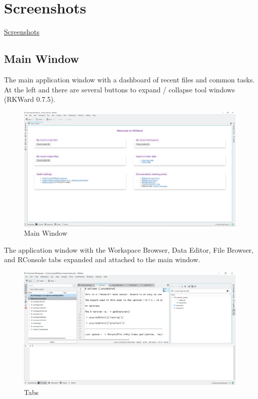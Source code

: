 \documentclass[
  letterpaper,
  DIV=11,
  numbers=noendperiod]{scrreprt}
\begin{document}

\hypertarget{screenshots}{%
\chapter{Screenshots}\label{screenshots}}

\href{https://rkward.kde.org/Screenshots.html}{Screenshots}

\hypertarget{main-window}{%
\section{Main Window}\label{main-window}}

The main application window with a dashboard of recent files and common
tasks. At the left and there are several buttons to expand / collapse
tool windows (RKWard 0.7.5).

\begin{figure}

{\centering \includegraphics{./images/main_window.png}

}

\caption{Main Window}

\end{figure}

The application window with the Workspace Browser, Data Editor, File
Browser, and RConsole tabs expanded and attached to the main window.

\begin{figure}

{\centering \includegraphics{./images/main_tabs.png}

}

\caption{Tabs}

\end{figure}
\end{document}

